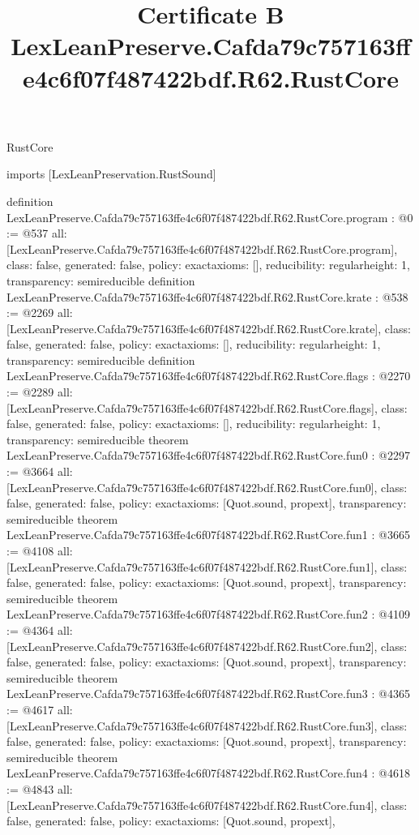 \begin{lexlean}{RustCore}
\title{Certificate B LexLeanPreserve.Cafda79c757163ffe4c6f07f487422bdf.R62.RustCore}
\begin{coremodule}
imports [LexLeanPreservation.RustSound]

definition LexLeanPreserve.Cafda79c757163ffe4c6f07f487422bdf.R62.RustCore.program : @0 := @537 {
  all: [LexLeanPreserve.Cafda79c757163ffe4c6f07f487422bdf.R62.RustCore.program],
  class: false,
  generated: false,
  policy: exact{axioms: []},
  reducibility: regular{height: 1},
  transparency: semireducible
}
definition LexLeanPreserve.Cafda79c757163ffe4c6f07f487422bdf.R62.RustCore.krate : @538 := @2269 {
  all: [LexLeanPreserve.Cafda79c757163ffe4c6f07f487422bdf.R62.RustCore.krate],
  class: false,
  generated: false,
  policy: exact{axioms: []},
  reducibility: regular{height: 1},
  transparency: semireducible
}
definition LexLeanPreserve.Cafda79c757163ffe4c6f07f487422bdf.R62.RustCore.flags : @2270 := @2289 {
  all: [LexLeanPreserve.Cafda79c757163ffe4c6f07f487422bdf.R62.RustCore.flags],
  class: false,
  generated: false,
  policy: exact{axioms: []},
  reducibility: regular{height: 1},
  transparency: semireducible
}
theorem LexLeanPreserve.Cafda79c757163ffe4c6f07f487422bdf.R62.RustCore.fun0 : @2297 := @3664 {
  all: [LexLeanPreserve.Cafda79c757163ffe4c6f07f487422bdf.R62.RustCore.fun0],
  class: false,
  generated: false,
  policy: exact{axioms: [Quot.sound, propext]},
  transparency: semireducible
}
theorem LexLeanPreserve.Cafda79c757163ffe4c6f07f487422bdf.R62.RustCore.fun1 : @3665 := @4108 {
  all: [LexLeanPreserve.Cafda79c757163ffe4c6f07f487422bdf.R62.RustCore.fun1],
  class: false,
  generated: false,
  policy: exact{axioms: [Quot.sound, propext]},
  transparency: semireducible
}
theorem LexLeanPreserve.Cafda79c757163ffe4c6f07f487422bdf.R62.RustCore.fun2 : @4109 := @4364 {
  all: [LexLeanPreserve.Cafda79c757163ffe4c6f07f487422bdf.R62.RustCore.fun2],
  class: false,
  generated: false,
  policy: exact{axioms: [Quot.sound, propext]},
  transparency: semireducible
}
theorem LexLeanPreserve.Cafda79c757163ffe4c6f07f487422bdf.R62.RustCore.fun3 : @4365 := @4617 {
  all: [LexLeanPreserve.Cafda79c757163ffe4c6f07f487422bdf.R62.RustCore.fun3],
  class: false,
  generated: false,
  policy: exact{axioms: [Quot.sound, propext]},
  transparency: semireducible
}
theorem LexLeanPreserve.Cafda79c757163ffe4c6f07f487422bdf.R62.RustCore.fun4 : @4618 := @4843 {
  all: [LexLeanPreserve.Cafda79c757163ffe4c6f07f487422bdf.R62.RustCore.fun4],
  class: false,
  generated: false,
  policy: exact{axioms: [Quot.sound, propext]},
}
\end{coremodule}
\end{lexlean}

